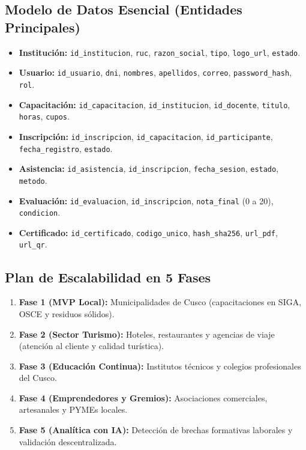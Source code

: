 \subsection{Modelo de Datos Esencial (Entidades Principales)}
\begin{itemize}\setlength\itemsep{0.15em}\raggedright
    \item \textbf{Institución:} \texttt{id\_institucion}, \texttt{ruc}, \texttt{razon\_social}, \texttt{tipo}, \texttt{logo\_url}, \texttt{estado}.
    \item \textbf{Usuario:} \texttt{id\_usuario}, \texttt{dni}, \texttt{nombres}, \texttt{apellidos}, \texttt{correo}, \texttt{password\_hash}, \texttt{rol}.
    \item \textbf{Capacitación:} \texttt{id\_capacitacion}, \texttt{id\_institucion}, \texttt{id\_docente}, \texttt{titulo}, \texttt{horas}, \texttt{cupos}.
    \item \textbf{Inscripción:} \texttt{id\_inscripcion}, \texttt{id\_capacitacion}, \texttt{id\_participante}, \texttt{fecha\_registro}, \texttt{estado}.
    \item \textbf{Asistencia:} \texttt{id\_asistencia}, \texttt{id\_inscripcion}, \texttt{fecha\_sesion}, \texttt{estado}, \texttt{metodo}.
    \item \textbf{Evaluación:} \texttt{id\_evaluacion}, \texttt{id\_inscripcion}, \texttt{nota\_final} (0 a 20), \texttt{condicion}.
    \item \textbf{Certificado:} \texttt{id\_certificado}, \texttt{codigo\_unico}, \texttt{hash\_sha256}, \texttt{url\_pdf}, \texttt{url\_qr}.
\end{itemize}

\subsection{Plan de Escalabilidad en 5 Fases}
\begin{enumerate}\setlength\itemsep{0.1em}
    \item \textbf{Fase 1 (MVP Local):} Municipalidades de Cusco (capacitaciones en SIGA, OSCE y residuos sólidos).
    \item \textbf{Fase 2 (Sector Turismo):} Hoteles, restaurantes y agencias de viaje (atención al cliente y calidad turística).
    \item \textbf{Fase 3 (Educación Continua):} Institutos técnicos y colegios profesionales del Cusco.
    \item \textbf{Fase 4 (Emprendedores y Gremios):} Asociaciones comerciales, artesanales y PYMEs locales.
    \item \textbf{Fase 5 (Analítica con IA):} Detección de brechas formativas laborales y validación descentralizada.
\end{enumerate}
